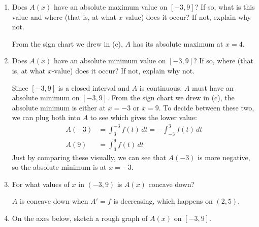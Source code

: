 \documentclass{article}
\begin{document}
\begin{enumerate}
\begin{enumerate}
  \item
    \begin{problem}[\vfill\vfill]
      Does $ A(x)$ have an absolute maximum value on $[-3, 9]$?  If
      so, what is this value and where (that is, at what $x$-value) does
      it occur?  If not, explain why not.
    \end{problem}

    \begin{solution}
      From the sign chart we drew in
      (c), $A$ has its
      absolute maximum at $\boxed{x = 4}$.
    \end{solution}

  \item %
    \label{spring2012-mb-midterm2-area-function-abs-min}
    \begin{problem}[\vfill\vfill\newpage]
      Does $ A(x)$ have an absolute minimum value on $[-3, 9]$?  If
      so, 
      where (that is, at what $x$-value) does it occur?  If not, explain
      why not.
    \end{problem}

    \begin{solution}
      Since $[-3, 9]$ is a closed interval and $A$ is continuous,
      $A$ must have an absolute minimum on $[-3, 9]$.  From the
      sign chart we drew in (c),
      the absolute minimum is either at $x = -3$ or $x = 9$.  To decide
      between these two, we can plug both into $A$ to see which
      gives the lower value:
      \begin{align*}
        A(-3) &= \int_{3}^{-3} f(t)\,dt = - \int_{-3}^3 f(t)\,dt \\
        A(9) &= \int_3^9 f(t)\,dt
      \end{align*}
      Just by comparing these visually, we can see that $ A(-3)$ is
      more negative, so the absolute minimum is at $\boxed{x = -3}$. 
    \end{solution}

  \item
    \begin{problem}[1.25in]
      For what values of $x$ in $(-3, 9)$ is $ A(x)$ concave down?
    \end{problem}

    \begin{solution}
      $A$ is concave down when $A' = f$ is decreasing, which
      happens on $\boxed{(2, 5)}$.
    \end{solution}

  \item \label{spring2012-mb-midterm2-area-function-sketch}
    \begin{problem}[\newpage]
      On the axes below, sketch a rough graph of $ A(x)$ on $[-3,
      9]$.  


\end{problem}
\end{enumerate}
\end{enumerate}
\end{document}
